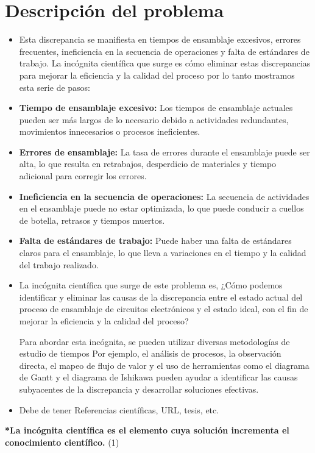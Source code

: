     \section{Descripción del problema}
    \begin{itemize}
    \item Esta discrepancia se manifiesta en tiempos de ensamblaje excesivos, errores frecuentes, ineficiencia en la secuencia de operaciones y falta de estándares de trabajo. La incógnita científica que surge es cómo eliminar estas discrepancias para mejorar la eficiencia y la calidad del proceso por lo tanto mostramos esta serie de pasos:
         \item \textbf{Tiempo de ensamblaje excesivo: }Los tiempos de ensamblaje actuales pueden ser más largos de lo necesario debido a actividades redundantes, movimientos innecesarios o procesos ineficientes.
    \item \textbf{Errores de ensamblaje:}
    La tasa de errores durante el ensamblaje puede ser alta, lo que resulta en retrabajos, desperdicio de materiales y tiempo adicional para corregir los errores.
    \item \textbf{Ineficiencia en la secuencia de operaciones:}
     La secuencia de actividades en el ensamblaje puede no estar optimizada, lo que puede conducir a cuellos de botella, retrasos y tiempos muertos.
    \item \textbf{Falta de estándares de trabajo:}
     Puede haber una falta de estándares claros para el ensamblaje, lo que lleva a variaciones en el tiempo y la calidad del trabajo realizado.
    \item La incógnita científica que surge de este problema es, ¿Cómo podemos identificar y eliminar las causas de la discrepancia entre el estado actual del proceso de ensamblaje de circuitos electrónicos y el estado ideal, con el fin de mejorar la eficiencia y la calidad del proceso?
    
    Para abordar esta incógnita, se pueden utilizar diversas metodologías de estudio de tiempos Por ejemplo, el análisis de procesos, la observación directa, el mapeo de flujo de valor y el uso de herramientas como el diagrama de Gantt y el diagrama de Ishikawa pueden ayudar a identificar las causas subyacentes de la discrepancia y desarrollar soluciones efectivas.
        \item Debe de tener Referencias científicas, URL, tesis, etc.
    \end{itemize}
    
    \textbf{*La incógnita científica es el elemento cuya solución incrementa el conocimiento científico.} (1) 
    
